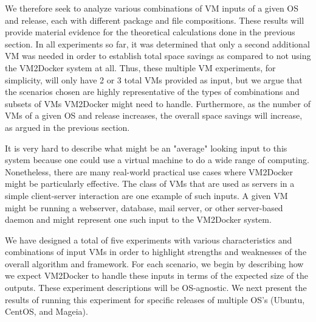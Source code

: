 We therefore seek to analyze various combinations of VM inputs of a given OS and release, each with different package and file compositions. These results will provide material evidence for the theoretical calculations done in the previous section. In all experiments so far, it was determined that only a second additional VM was needed in order to establish total space savings as compared to not using the VM2Docker system at all. Thus, these multiple VM experiments, for simplicity, will only have 2 or 3 total VMs provided as input, but we argue that the scenarios chosen are highly representative of the types of combinations and subsets of VMs VM2Docker might need to handle. Furthermore, as the number of VMs of a given OS and release increases, the overall space savings will increase, as argued in the previous section.

It is very hard to describe what might be an "average" looking input to this system because one could use a virtual machine to do a wide range of computing. Nonetheless, there are many real-world practical use cases where VM2Docker might be particularly effective. The class of VMs that are used as servers in a simple client-server interaction are one example of such inputs. A given VM might be running a webserver, database, mail server, or other server-based daemon and might represent one such input to the VM2Docker system. 

We have designed a total of five experiments with various characteristics and combinations of input VMs in order to highlight strengths and weaknesses of the overall algorithm and framework. For each scenario, we begin by describing how we expect VM2Docker to handle these inputs in terms of the expected size of the outputs. These experiment descriptions will be OS-agnostic. We next present the results of running this experiment for specific releases of multiple OS's (Ubuntu, CentOS, and Mageia). 

